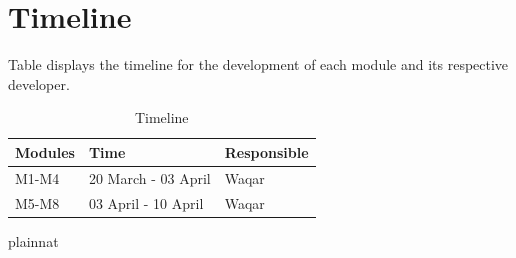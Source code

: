 \documentclass[12pt, titlepage]{article}
\begin{document}
\section{Timeline}


Table displays the timeline for the development of each module and its respective developer.

\begin{table}[H]
\centering
\begin{tabular}{p{} p{}  p{}}
\toprule
 \textbf{Modules} & \textbf{Time} & \textbf{Responsible} \\
\midrule
M1-M4& 20 March - 03 April & Waqar\\
M5-M8 & 03 April - 10 April & Waqar\\
\bottomrule
\end{tabular}
\caption{Timeline}
\end{table}

 {plainnat}


\newpage{}
\end{document}
